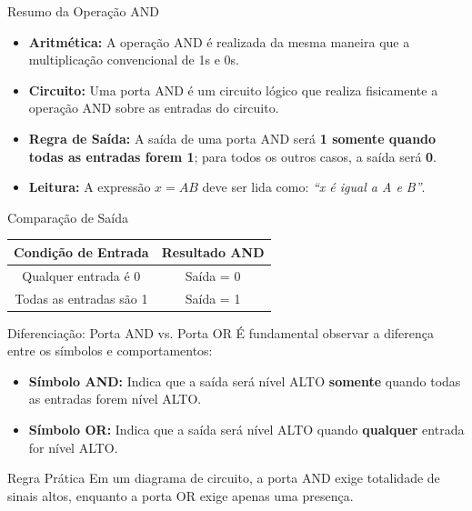 \begin{frame}{Resumo da Operação AND}
    \begin{itemize}
        \item \textbf{Aritmética:} A operação AND é realizada da mesma maneira que a multiplicação convencional de 1s e 0s.
        \item \textbf{Circuito:} Uma porta AND é um circuito lógico que realiza fisicamente a operação AND sobre as entradas do circuito.
        \item \textbf{Regra de Saída:} A saída de uma porta AND será \textbf{1 somente quando todas as entradas forem 1}; para todos os outros casos, a saída será \textbf{0}.
        \item \textbf{Leitura:} A expressão $x = AB$ deve ser lida como: \textit{“x é igual a A e B”}.
    \end{itemize}
    \vspace{0.4cm}
    \begin{block}{Comparação de Saída}
        \centering
        \begin{tabular}{c|c}
            \textbf{Condição de Entrada} & \textbf{Resultado AND} \\ \hline
            Qualquer entrada é 0         & Saída = 0              \\
            Todas as entradas são 1      & Saída = 1              \\
        \end{tabular}
    \end{block}
\end{frame}


\begin{frame}{Diferenciação: Porta AND vs. Porta OR}
    É fundamental observar a diferença entre os símbolos e comportamentos:
    \vspace{0.4cm}
    \begin{itemize}
        \item \textbf{Símbolo AND:} Indica que a saída será nível ALTO \textbf{somente} quando todas as entradas forem nível ALTO.
        \item \textbf{Símbolo OR:} Indica que a saída será nível ALTO quando \textbf{qualquer} entrada for nível ALTO.
    \end{itemize}
    \vspace{0.4cm}
    \begin{block}{Regra Prática}
        Em um diagrama de circuito, a porta AND exige totalidade de sinais altos, enquanto a porta OR exige apenas uma presença.
    \end{block}
\end{frame}

